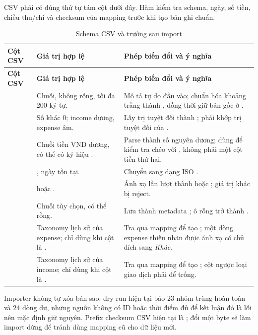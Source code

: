 CSV phải có đúng thứ tự tám cột dưới đây. Hàm
 kiểm tra schema, ngày, số tiền, chiều thu/chi và checksum của mapping trước khi tạo bản ghi chuẩn.

\begin{longtable}{@{}L{3.2cm}L{3.0cm}L{8.3cm}@{}}
  \caption{Schema CSV và trường sau import}
  \label{tab:app-dataset-schema}\\
  \toprule
  \textbf{Cột CSV} & \textbf{Giá trị hợp lệ} & \textbf{Phép biến đổi và ý nghĩa} \\
  \midrule
  \endfirsthead
  \toprule
  \textbf{Cột CSV} & \textbf{Giá trị hợp lệ} & \textbf{Phép biến đổi và ý nghĩa} \\
  \midrule
  \endhead
   & Chuỗi, không rỗng, tối đa 200 ký tự. & Mô tả tự do đầu vào; chuẩn hóa khoảng trắng thành , đồng thời giữ bản gốc ở . \\
   & Số khác 0; income dương, expense âm. & Lấy trị tuyệt đối thành ; phải khớp trị tuyệt đối của . \\
   & Chuỗi tiền VND dương, có thể có ký hiệu . & Parse thành số nguyên dương; dùng để kiểm tra chéo với , không phải một cột tiền thứ hai. \\
   & , ngày tồn tại. & Chuyển sang  dạng ISO . \\
   &  hoặc . & Ánh xạ lần lượt thành  hoặc ; giá trị khác bị reject. \\
   & Chuỗi tùy chọn, có thể rỗng. & Lưu thành metadata ; ô rỗng trở thành . \\
   & Taxonomy lịch sử của expense; chỉ dùng khi cột  là . & Tra qua mapping để tạo ; một dòng expense thiếu nhãn được ánh xạ có chủ đích sang \textit{Khác}. \\
   & Taxonomy lịch sử của income; chỉ dùng khi cột  là . & Tra qua mapping để tạo ; cột ngược loại giao dịch phải để trống. \\
  \bottomrule
\end{longtable}

Importer không tự xóa bản sao: dry-run hiện tại báo 23 nhóm trùng hoàn toàn và 24 dòng dư, nhưng nguồn không có ID hoặc thời điểm đủ để kết luận đó là lỗi nên mặc định giữ nguyên. Prefix checksum CSV hiện tại là ; đổi một byte sẽ làm import dừng để tránh dùng mapping cũ cho dữ liệu mới.

